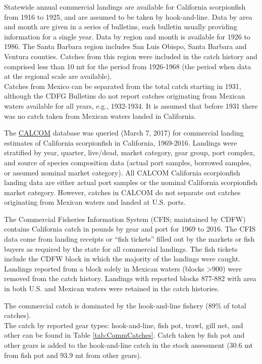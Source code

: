 \documentclass[12pt,]{article}
\begin{document}
Statewide annual commercial landings are available for California
scorpionfish from 1916 to 1925, and are assumed to be taken by
hook-and-line. Data by area and month are given in a series of
bulletins, each bulletin usually providing information for a single
year. Data by region and month is available for 1926 to 1986. The Santa
Barbara region includes San Luis Obispo, Santa Barbara and Ventura
counties. Catches from this region were included in the catch history
and comprised less than 10 mt for the period from 1926-1968 (the period
when data at the regional scale are available).\\
Catches from Mexico can be separated from the total catch starting in
1931, although the CDFG Bulletins do not report catches originating from
Mexican waters available for all years, e.g., 1932-1934. It is assumed
that before 1931 there was no catch taken from Mexican waters landed in
California.

The \href{http://128.114.3.187/}{CALCOM} database was queried (March 7,
2017) for commercial landing estimates of California scorpionfish in
California, 1969-2016. Landings were stratified by year, quarter,
live/dead, market category, gear group, port complex, and source of
species composition data (actual port samples, borrowed samples, or
assumed nominal market category). All CALCOM California scorpionfish
landing data are either actual port samples or the nominal California
scorpionfish market category. However, catches in CALCOM do not separate
out catches originating from Mexican waters and landed at U.S. ports.

The Commercial Fisheries Information System (CFIS; maintained by CDFW)
contains California catch in pounds by gear and port for 1969 to 2016.
The CFIS data come from landing receipts or ``fish tickets'' filled out
by the markets or fish buyers as required by the state for all
commercial landings. The fish tickets include the CDFW block in which
the majority of the landings were caught. Landings reported from a block
solely in Mexican waters (blocks \textgreater{}900) were removed from
the catch history. Landings with reported blocks 877-882 with area in
both U.S. and Mexican waters were retained in the catch histories.

The commercial catch is dominated by the hook-and-line fishery (89\% of
total catches).\\
The catch by reported gear types: hook-and-line, fish pot, trawl, gill
net, and other can be found in Table \ref{tab:CommCatches}. Catch taken
by fish pot and other gears is added to the hook-and-line catch in the
stock assessment (30.6 mt from fish pot and 93.9 mt from other gears).
\end{document}
